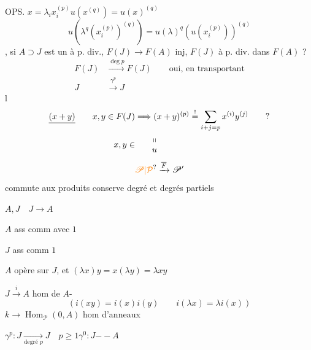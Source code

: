 OPS. \quad $x=\lambda_i x_i^{(p)}$\qquad $u(x^{(q)})=u(x)^{(q)}$
\[
u(\lambda^q(x_i^{(p)})^{(q)})=u(\lambda)^q(u(x_i^{(p)}))^{(q)}
\]
, si $A\supset J$ est un  à p. div.,  $F(J)\longrightarrow F(A)$ inj,  $F(J)$ à p. div. dans $F(A)$ ?
\[
\begin{aligned}
F(J)&\xrightarrow{\deg p}F(J)\qquad\text{oui, en transportant}\\
J&\xrightarrow{\gamma^p}J
\end{aligned}
\]
 l
\[
\begin{aligned}
\deleted{(x+y)}\qquad x,y\in F(J)&\Longrightarrow (x+y)^{(p)}\overset{!}{=}\sum_{i+j=p}x^{(i)}y^{(j)}\qquad ?\\
x,y\in&\qquad\begin{matrix}\shortparallel\\u\end{matrix}
\end{aligned}
\]
\[
\unsure{\mathscr P|\mathcal P}\xrightarrow{\overline F}\mathscr P'
\]
commute aux produits conserve degré et degrés partiels



$A,J\quad J\to A$

$A$  ass comm avec $1$

$J$  ass comm  $1$

$A$ opère sur $J$, et $(\lambda x)y=x(\lambda y)=\lambda xy$

$J\xrightarrow{i}A$ hom de $A$-
\[
(i(xy)=i(x)i(y)\qquad i(\lambda x)=\lambda i(x))
\]
$k\to\operatorname{Hom}_{\mathscr P}(0,A)$ hom d'anneaux

$\gamma^p:J\xrightarrow[\text{degré }p]{}J\quad p\geqslant1$\qquad $\gamma^0:J\mathrel{-\!\!-}A$

